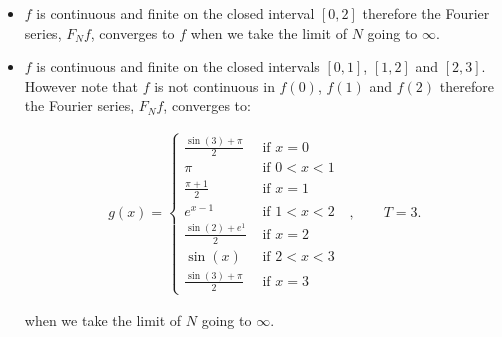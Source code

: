 \documentclass[11pt]{article}
\begin{document}
\begin{solution}     
\begin{itemize}
\item $f$ is continuous and finite on the closed interval $[0,2]$ therefore the Fourier series, $F_N f$, converges to $f$ when we take the limit of $N$ going to $\infty$.
\item $f$ is continuous and finite on the closed intervals $[0,1]$, $[1,2]$ and $[2,3]$. However note that $f$ is not continuous in $f(0)$, $f(1)$ and $f(2)$ therefore the Fourier series, $F_N f$, converges to: 

\begin{gather*}
            g(x) = \left\{\begin{array}{ll}
                            \frac{\sin(3) + \pi}{2} & \text{ if $x = 0$ }
						\\
                            \pi   & \text{ if $0 < x < 1$ }
                            \\
                            \frac{\pi + 1}{2} & \text{ if $x = 1$ }
						\\
                            e^{x-1} & \text{ if $1 < x < 2$ }
						\\
                            \frac{\sin(2) + e^1}{2} & \text{ if $x = 2$ }
						\\
                            \sin(x) & \text{ if $2 < x < 3$ }
						\\
                            \frac{\sin(3) + \pi}{2} & \text{ if $x = 3$ }
                          \end{array}\right., \qquad T = 3.
\end{gather*}

when we take the limit of $N$ going to $\infty$.
\end{itemize}
\end{solution}
\end{document}
